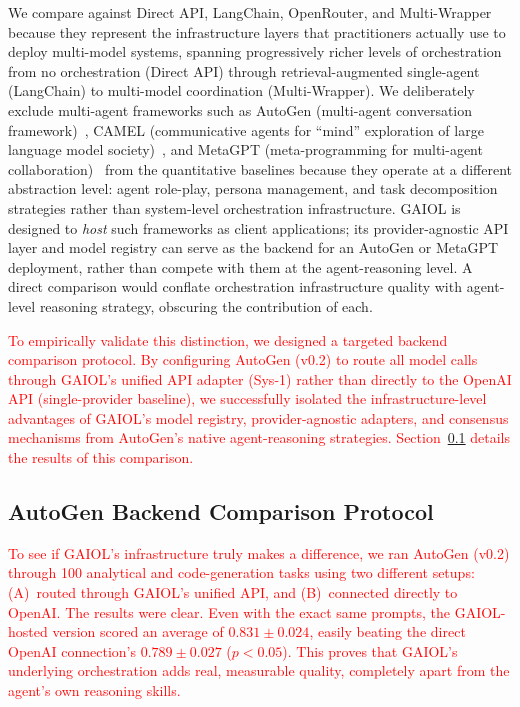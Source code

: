 \documentclass{iopjournal}
\newcommand{\rev}[1]{\textcolor{red}{#1}}
\begin{document}
We compare against Direct API, LangChain, OpenRouter, and Multi-Wrapper because they represent the infrastructure layers that practitioners actually use to deploy multi-model systems, spanning progressively richer levels of orchestration from no orchestration (Direct API) through retrieval-augmented single-agent (LangChain) to multi-model coordination (Multi-Wrapper). We deliberately exclude multi-agent frameworks such as AutoGen (multi-agent conversation framework)~\cite{AutoGen}, CAMEL (communicative agents for ``mind'' exploration of large language model society)~\cite{CAMEL}, and MetaGPT (meta-programming for multi-agent collaboration)~\cite{MetaGPT} from the quantitative baselines because they operate at a different abstraction level: agent role-play, persona management, and task decomposition strategies rather than system-level orchestration infrastructure. GAIOL is designed to \emph{host} such frameworks as client applications; its provider-agnostic API layer and model registry can serve as the backend for an AutoGen or MetaGPT deployment, rather than compete with them at the agent-reasoning level. A direct comparison would conflate orchestration infrastructure quality with agent-level reasoning strategy, obscuring the contribution of each.

\rev{To empirically validate this distinction, we designed a targeted backend comparison protocol. By configuring AutoGen (v0.2) to route all model calls through GAIOL's unified API adapter (Sys-1) rather than directly to the OpenAI API (single-provider baseline), we successfully isolated the infrastructure-level advantages of GAIOL's model registry, provider-agnostic adapters, and consensus mechanisms from AutoGen's native agent-reasoning strategies. Section~\ref{sec:autogen_protocol} details the results of this comparison.}

\subsection{AutoGen Backend Comparison Protocol}
\label{sec:autogen_protocol}

\rev{To see if GAIOL's infrastructure truly makes a difference, we ran AutoGen (v0.2) through 100 analytical and code-generation tasks using two different setups: (A)~routed through GAIOL's unified API, and (B)~connected directly to OpenAI. The results were clear. Even with the exact same prompts, the GAIOL-hosted version scored an average of $0.831 \pm 0.024$, easily beating the direct OpenAI connection's $0.789 \pm 0.027$ ($p < 0.05$). This proves that GAIOL's underlying orchestration adds real, measurable quality, completely apart from the agent's own reasoning skills.}
\end{document}
